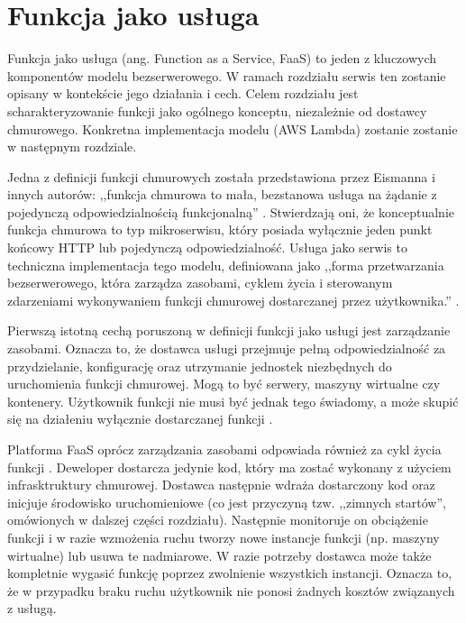 \section{Funkcja jako usługa}\label{chapter:funkcja_jako_usluga}

Funkcja jako usługa (ang. Function as a Service, FaaS) to jeden z kluczowych komponentów modelu bezserwerowego.
W ramach rozdziału serwis ten zostanie opisany w kontekście jego działania i cech.
Celem rozdziału jest scharakteryzowanie funkcji jako ogólnego konceptu, niezależnie od dostawcy chmurowego.
Konkretna implementacja modelu (AWS Lambda) zostanie zostanie w następnym rozdziale.

Jedna z definicji funkcji chmurowych została przedstawiona przez Eismanna i innych autorów: ,,funkcja chmurowa to mała, bezstanowa usługa na żądanie z pojedynczą odpowiedzialnością funkcjonalną'' \cite{SpecRgCloudGroupVisionOnThePerformanceChallengesOfFaas}.
Stwierdzają oni, że konceptualnie funkcja chmurowa to typ mikroserwisu, który posiada wyłącznie jeden punkt końcowy HTTP lub pojedynczą odpowiedzialność.
Usługa jako serwis to techniczna implementacja tego modelu, definiowana jako ,,forma przetwarzania bezserwerowego, która zarządza zasobami, cyklem życia i sterowanym zdarzeniami wykonywaniem funkcji chmurowej dostarczanej przez użytkownika.'' \cite{SpecRgCloudGroupVisionOnThePerformanceChallengesOfFaas}.

Pierwszą istotną cechą poruszoną w definicji funkcji jako usługi jest zarządzanie zasobami. 
Oznacza to, że dostawca usługi przejmuje pełną odpowiedzialność za przydzielanie, konfigurację oraz utrzymanie jednostek niezbędnych do uruchomienia funkcji chmurowej.
Mogą to być serwery, maszyny wirtualne czy kontenery.
Użytkownik funkcji nie musi być jednak tego świadomy, a może skupić się na działeniu wyłącznie dostarczanej funkcji \cite{eismann2021reviewserverlessusecases}.

Platforma FaaS oprócz zarządzania zasobami odpowiada również za cykl życia funkcji \cite{ServerlessIsMoreFromPaaSToPresentCloudComputing}. 
Deweloper dostarcza jedynie kod, który ma zostać wykonany z użyciem infrasktruktury chmurowej.
Dostawca następnie wdraża dostarczony kod oraz inicjuje środowisko uruchomieniowe (co jest przyczyną tzw. ,,zimnych startów'', omówionych w dalszej części rozdziału).
Następnie monitoruje on obciążenie funkcji i w razie wzmożenia ruchu tworzy nowe instancje funkcji (np. maszyny wirtualne) lub usuwa te nadmiarowe. 
W razie potrzeby dostawca może także kompletnie wygasić funkcję poprzez zwolnienie wszystkich instancji.
Oznacza to, że w przypadku braku ruchu użytkownik nie ponosi żadnych kosztów związanych z usługą.

